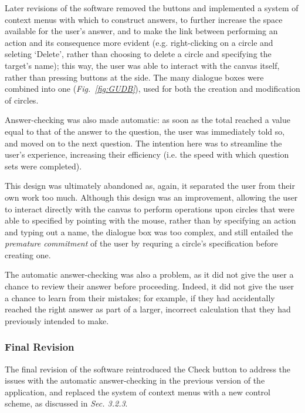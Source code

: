 \documentclass[12pt,twoside,notitlepage,xetex]{report}
\begin{document}
{Later revisions of the software removed the buttons and implemented a system of context menus with which to construct answers, to further increase the space available for the user's answer, and to make the link between performing an action and its consequence more evident (e.g. right-clicking on a circle and seleting `Delete', rather than choosing to delete a circle and specifying the target's name); this way, the user was able to interact with the canvas itself, rather than pressing buttons at the side.  The many dialogue boxes were combined into one (\emph{Fig.~\ref{fig:GUDB}}), used for both the creation and modification of circles.

Answer-checking was also made automatic: as soon as the total reached a value equal to that of the answer to the question, the user was immediately told so, and moved on to the next question.  The intention here was to streamline the user's experience, increasing their efficiency (i.e. the speed with which question sets were completed).

This design was ultimately abandoned as, again, it separated the user from their own work too much.  Although this design was an improvement, allowing the user to interact directly with the canvas to perform operations upon circles that were able to specified by pointing with the mouse, rather than by specifying an action and typing out a name, the dialogue box was too complex, and still entailed the \emph{premature commitment} of the user by requring a circle's specification before creating one.

The automatic answer-checking was also a problem, as it did not give the user a chance to review their answer before proceeding.  Indeed, it did not give the user a chance to learn from their mistakes; for example, if they had accidentally reached the right answer as part of a larger, incorrect calculation that they had previously intended to make.

\subsubsection{Final Revision}

The final revision of the software reintroduced the {\sfapp Check} button to address the issues with the automatic answer-checking in the previous version of the application, and replaced the system of context menus with a new control scheme, as discussed in \emph{Sec. 3.2.3}.

}
\end{document}

